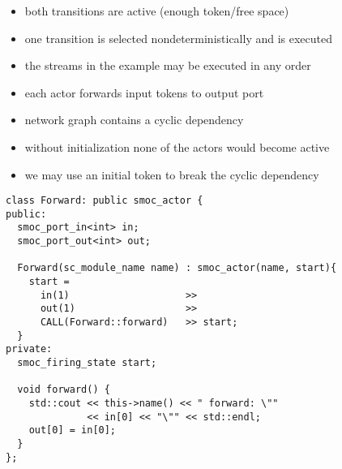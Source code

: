 \begin{frame}
\begin{itemize}
\item both transitions are active (enough token/free space)
\item one transition is selected nondeterministically and is executed
\item the streams in the example may be executed in any order
\end{itemize}
\end{frame}




\begin{frame}
\begin{figure}
\centering
\resizebox{0.9\columnwidth}{!}{}
\end{figure}
\begin{itemize}
\item each actor forwards input tokens to output port
\item network graph contains a cyclic dependency
\item without initialization none of the actors would become active
\item we may use an initial token to break the cyclic dependency
\end{itemize}
\end{frame}





\begin{frame}[fragile=singleslide]
\begin{lstlisting}
class Forward: public smoc_actor {
public:
  smoc_port_in<int> in;
  smoc_port_out<int> out;

  Forward(sc_module_name name) : smoc_actor(name, start){
    start = 
      in(1)                    >>
      out(1)                   >>
      CALL(Forward::forward)   >> start;
  }
private:
  smoc_firing_state start;

  void forward() {
    std::cout << this->name() << " forward: \""
              << in[0] << "\"" << std::endl;
    out[0] = in[0];
  }
};
\end{lstlisting}
\end{frame}





